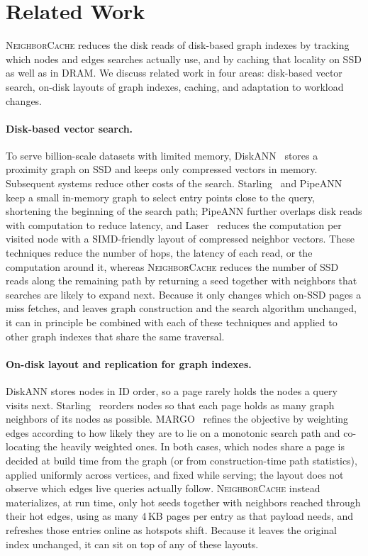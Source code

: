 \section{Related Work}
\label{sec:related}

\textsc{NeighborCache} reduces the disk reads of disk-based graph indexes by tracking which nodes and edges searches actually use, and by caching that locality on SSD as well as in DRAM.
We discuss related work in four areas: disk-based vector search, on-disk layouts of graph indexes, caching, and adaptation to workload changes.

\paragraph{Disk-based vector search.}
To serve billion-scale datasets with limited memory, DiskANN~\cite{diskann} stores a proximity graph on SSD and keeps only compressed vectors in memory.
Subsequent systems reduce other costs of the search.
Starling~\cite{starling} and PipeANN~\cite{pipeann} keep a small in-memory graph to select entry points close to the query, shortening the beginning of the search path; PipeANN further overlaps disk reads with computation to reduce latency, and Laser~\cite{laser} reduces the computation per visited node with a SIMD-friendly layout of compressed neighbor vectors.
These techniques reduce the number of hops, the latency of each read, or the computation around it, whereas \textsc{NeighborCache} reduces the number of SSD reads along the remaining path by returning a seed together with neighbors that searches are likely to expand next.
Because it only changes which on-SSD pages a miss fetches, and leaves graph construction and the search algorithm unchanged, it can in principle be combined with each of these techniques and applied to other graph indexes that share the same traversal.

\paragraph{On-disk layout and replication for graph indexes.}
DiskANN stores nodes in ID order, so a page rarely holds the nodes a query visits next.
Starling~\cite{starling} reorders nodes so that each page holds as many graph neighbors of its nodes as possible.
MARGO~\cite{margo} refines the objective by weighting edges according to how likely they are to lie on a monotonic search path and co-locating the heavily weighted ones.
In both cases, which nodes share a page is decided at build time from the graph (or from construction-time path statistics), applied uniformly across vertices, and fixed while serving; the layout does not observe which edges live queries actually follow.
\textsc{NeighborCache} instead materializes, at run time, only hot seeds together with neighbors reached through their hot edges, using as many 4\,KB pages per entry as that payload needs, and refreshes those entries online as hotspots shift.
Because it leaves the original index unchanged, it can sit on top of any of these layouts.

